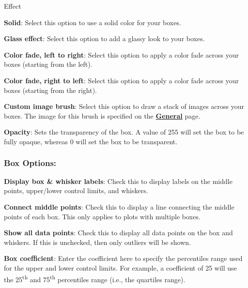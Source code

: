 \documentclass[
]{book}
\newenvironment{optionssection}
    {
    \begin{tcolorbox}[colframe=lightgray,colback=ultralightgray,sharp corners=all,parbox=false]
    }
    {
    \end{tcolorbox}
    }
\newenvironment{optionssectiontitle}
    {
    \begin{tcolorbox}[colframe=lightgray,colback=lightgray]
    \bfseries
    }
    {
    \end{tcolorbox}
    }
\theoremstyle{definition}
\theoremstyle{definition}
\theoremstyle{definition}
\theoremstyle{definition}
\theoremstyle{remark}
\begin{document}
\begin{optionssection}

\begin{optionssectiontitle}
Effect

\end{optionssectiontitle}

\textbf{Solid}: Select this option to use a solid color for your boxes.

\textbf{Glass effect}: Select this option to add a glassy look to your boxes.

\textbf{Color fade, left to right}: Select this option to apply a color fade across your boxes (starting from the left).

\textbf{Color fade, right to left}: Select this option to apply a color fade across your boxes (starting from the right).

\textbf{Custom image brush}: Select this option to draw a stack of images across your boxes. The image for this brush is specified on the \protect\hyperlink{options-graphs}{\textbf{General}} page.

\end{optionssection}

\textbf{Opacity}: Sets the transparency of the box. A value of 255 will set the box to be fully opaque, whereas 0 will set the box to be transparent.

\hypertarget{box-options}{%
\subsubsection*{Box Options:}\label{box-options}}

\textbf{Display box \& whisker labels}: Check this to display labels on the middle points, upper/lower control limits, and whiskers.

\textbf{Connect middle points}: Check this to display a line connecting the middle points of each box. This only applies to plots with multiple boxes.

\textbf{Show all data points}: Check this to display all data points on the box and whiskers. If this is unchecked, then only outliers will be shown.

\textbf{Box coefficient}: Enter the coefficient here to specify the percentiles range used for the upper and lower control limits. For example, a coefficient of 25 will use the 25\textsuperscript{th} and 75\textsuperscript{th} percentiles range (i.e., the quartiles range).
\end{document}
